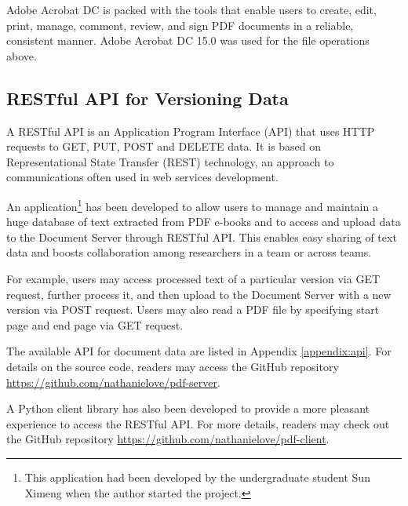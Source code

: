 Adobe Acrobat DC is packed with the tools that enable users to create, edit, print, manage, comment, review, and sign PDF documents in a reliable, consistent manner. Adobe Acrobat DC 15.0 was used for the file operations above.

\subsection{RESTful API for Versioning Data}
A RESTful API is an Application Program Interface (API) that uses HTTP requests to GET, PUT, POST and DELETE data. It is based on Representational State Transfer (REST) technology, an approach to communications often used in web services development.

An application\footnote{This application had been developed by the undergraduate student Sun Ximeng when the author started the project.} has been developed to allow users to manage and maintain a huge database of text extracted from PDF e-books and to access and upload data to the Document Server through RESTful API. This enables easy sharing of text data and boosts collaboration among  researchers in a team or across teams.

For example, users may access processed text of a particular version via GET request, further process it, and then upload to the Document Server with a new version via POST request. Users may also read a PDF file by specifying start page and end page via GET request.

The available API for document data are listed in Appendix \ref{appendix:api}. For details on the source code, readers may access the GitHub repository \url{https://github.com/nathanielove/pdf-server}.

A Python client library has also been developed to provide a more pleasant experience to access the RESTful API. For more details, readers may check out the GitHub repository \url{https://github.com/nathanielove/pdf-client}.



